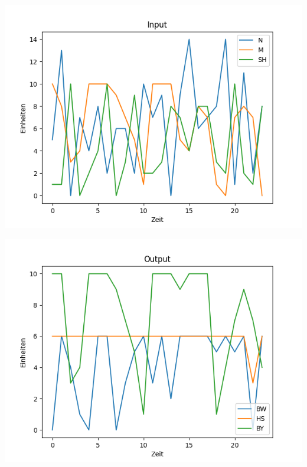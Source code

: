 \documentclass[aspectratio=169,t]{beamer}
\begin{document}
	\begin{frame}
		\frametitle{}
		\vspace*{8mm}
		\begin{minipage}{1\linewidth}
		
			\begin{minipage}{.5\linewidth}
				\centering
				\includegraphics[width=1\linewidth]{Figure_1.png}
				
			\end{minipage}
			\hfill
			\begin{minipage}{.5\linewidth}
				\centering
				\includegraphics[width=1\linewidth]{Figure_2.png}
				
			\end{minipage}
		\end{minipage}	
		
		
		
	\end{frame}
\end{document}
